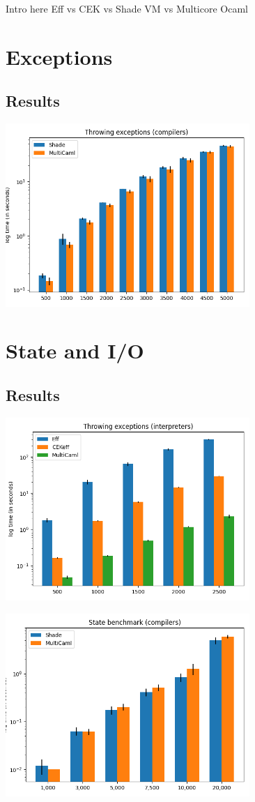 \documentclass[class=article, crop=false]{standalone}
\begin{document}
Intro here
Eff vs CEK vs Shade VM vs Multicore Ocaml

\section{Exceptions}

\subsection{Results}

\includegraphics[width=25em]{eval_plots/exc_comp.png}

\section{State and I/O}

\subsection{Results}

\includegraphics[width=25em]{eval_plots/state_interp.png}

\includegraphics[width=25em]{eval_plots/state_comp.png}
\end{document}

